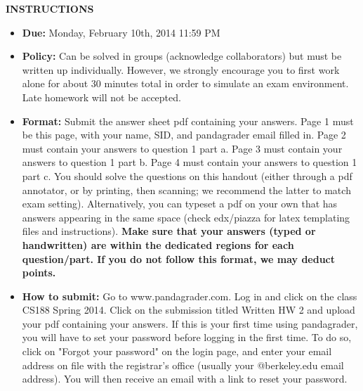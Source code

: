 \smallskip
\smallskip
\textbf{INSTRUCTIONS}

\begin{itemize}
\item \textbf{Due:} Monday, February 10th, 2014 11:59 PM
\item \textbf{Policy:} Can be solved in groups (acknowledge collaborators) but must
be written up individually. However,
we strongly encourage you to first work alone for about 30 minutes total in order to simulate an exam environment.  Late homework
will not be accepted.
\item \textbf{Format:}  Submit the answer sheet pdf containing your answers. Page 1
must be this page, with your name,
SID, and pandagrader email filled in. Page 2 must contain your answers
to question 1 part a. Page 3 must contain your answers to question 1 part b. Page 4 must contain your answers to question 1 part c.
You should solve the questions on this handout (either through a pdf annotator, or by printing, then scanning; we recommend the latter to match exam setting). Alternatively, you can typeset a pdf on your own that has answers appearing in the same space (check edx/piazza for latex templating files and instructions).
\textbf{Make sure that your answers (typed or handwritten) are within the
dedicated regions for each question/part.  If you do not follow this format, we may deduct points.}

\item \textbf{How to submit:}  Go to www.pandagrader.com. Log in and click on the
class CS188 Spring 2014. Click
on the submission titled Written HW 2 and upload your pdf containing your answers. If this is your first time using
pandagrader, you will have to set your password before logging in the
first time.  To do so, click on "Forgot your password" on the login
page, and enter your email address on file with the registrar's office
(usually your @berkeley.edu email address). You will then receive an
email with a link to reset your password.

\end{itemize}


